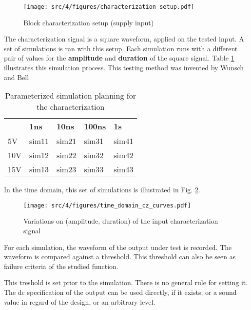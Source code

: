 \begin{figure}[!h]
  \centering
  \texttt{[image: src/4/figures/characterization\_setup.pdf]}
  \caption{Block characterization setup (supply input)}
  \label{block_function_cz}
\end{figure}

The characterization signal is a square waveform, applied on the tested input.
A set of simulations is ran with this setup.
Each simulation runs with a different pair of values for the \textbf{amplitude} and \textbf{duration} of the square signal.
Table \ref{parameterized-simulations} illustrates this simulation process.
This testing method was invented by Wunsch and Bell

\begin{table}[!h]
\centering
\begin{tabular}{@{}lllll@{}}
\toprule
    & 1ns   & 10ns  & 100ns & 1\textmugreek{}s   \\ \midrule
5V  & sim11 & sim21 & sim31 & sim41 \\
10V & sim12 & sim22 & sim32 & sim42 \\
15V & sim13 & sim23 & sim33 & sim43 \\ \bottomrule
\end{tabular}
\caption{Parameterized simulation planning for the characterization}
\label{parameterized-simulations}
\end{table}

In the time domain, this set of simulations is illustrated in Fig. \ref{set_input_signals}.

\begin{figure}[!h]
  \centering
  \texttt{[image: src/4/figures/time\_domain\_cz\_curves.pdf]}
  \caption{Variations on (amplitude, duration) of the input characterization signal}
  \label{set_input_signals}
\end{figure}

For each simulation, the waveform of the output under test is recorded.
The waveform is compared against a threshold.
This threshold can also be seen as failure criteria of the studied function.

This treshold is set prior to the simulation.
There is no general rule for setting it.
The \gls{dc} specification of the output can be used directly, if it exists, or a sound value in regard of the design, or an arbitrary level.

